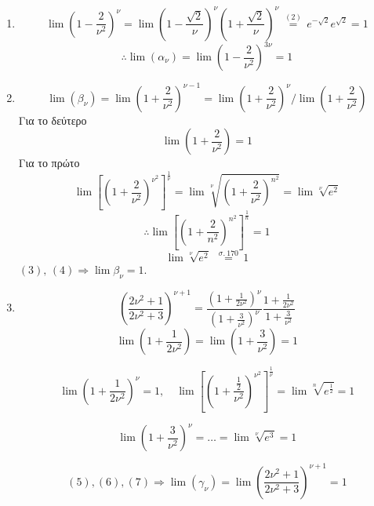 \documentclass[a4paper]{article}
\numberwithin{equation}{section} %
\newcounter{set}
\renewcommand{\a}{\alpha}
\newcommand{\n}{\nu}
\begin{document}
\begin{enumerate}[label=\roman*)]
    \item
    \[
    \lim {{\left( 1-\frac{2}{{{\n}^{2}}} \right)}^{\n}}=\lim {{\left( 1-\frac{\sqrt{2}}{\n} \right)}^{\n}}{{\left( 1+\frac{\sqrt{2}}{\n} \right)}^{\n}}\ 
    \overset{(2)}{\mathop{=}} \,{{e}^{-\sqrt{2}}}{{e}^{\sqrt{2}}}=1
    \]
    \[
    \therefore \lim \left( {{\a}_{\n}} \right)=\lim {{\left( 1-\frac{2}{{{\n}^{2}}} \right)}^{3\n}}=1
    \]
    \item 
    \[
    \lim \left( {{\beta }_{\n}} \right)={\lim{\left( 1+\frac{2}{{{\n}^{2}}} \right)}^{\n-1}}={\lim{\left( 1+\frac{2}{{{\n}^{2}}} \right)}^{\n}}/\lim\left( 1+\frac{2}{{{\n}^{2}}} \right)
    \]
    Για το δεύτερο
    \[
    \lim\left( 1+\frac{2}{{{\n}^{2}}} \right) = 1
    \tag{3}
    \]
    Για το πρώτο
    \[
    \lim {{\left[ {{\left( 1+\frac{2}{{{\n}^{2}}} \right)}^{{{\n}^{2}}}} \right]}^{\frac{1}{\n}}}=\lim \sqrt[\n]{{{\left( 1+\frac{2}{{{\n}^{2}}} \right)}^{{{n}^{2}}}}}=\lim \sqrt[\n]{{{e}^{2}}}
    \]
    \[
    \therefore \lim {{\left[ {{\left( 1+\frac{2}{{{n}^{2}}} \right)}^{{{n}^{2}}}} \right]}^{\frac{1}{n}}}=1 \tag{4}
    \]
    \[
    \lim \sqrt[\n]{{{e}^{2}}}\ \ \overset{\sigma .\ 170}{\mathop{=}}\,1
    \]
    $(3),\, (4) \Rightarrow \lim \beta_\n = 1$.
    
    \item
    \[{{\left( \frac{2{{\n}^{2}}+1}{2{{\n}^{2}}+3} \right)}^{\n+1}}=\frac{{{\left( 1+\frac{1}{2{{\n}^{2}}} \right)}^{\n}}}{{{\left( 1+\frac{3}{{{\n}^{2}}} \right)}^{\n}}}\frac{1+\frac{1}{2{{\n}^{2}}}}{1+\frac{3}{{{\n}^{2}}}}\]
    \[\lim \left( 1+\frac{1}{2{{\n}^{2}}} \right)=\lim \left( 1+\frac{3}{{{\n}^{2}}} \right)=1 \tag{5}\]
    
    \[\lim {{\left( 1+\frac{1}{2{{\n}^{2}}} \right)}^{\n}}=1, \quad \lim {{\left[ {{\left( 1+\frac{\frac{1}{2}}{{{\n}^{2}}} \right)}^{{{\n}^{2}}}} \right]}^{\frac{1}{\n}}}=\lim \sqrt[n]{{{e}^{\frac{1}{2}}}}=1 \tag{6}\]
    
    \[\lim {{\left( 1+\frac{3}{{{\n}^{2}}} \right)}^{\n}}=\ldots=\lim \sqrt[\n]{{{e}^{3}}}=1 \tag{7}\]
    
    \[\left( 5 \right),\left( 6 \right),\left( 7 \right)\Rightarrow \lim \left( {{\gamma }_{\n}} \right)=\lim {{\left( \frac{2{{\n}^{2}}+1}{2{{\n}^{2}}+3} \right)}^{\n+1}}=1\]
    
    
\end{enumerate}
\end{document}
